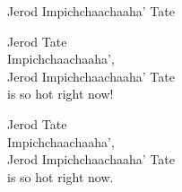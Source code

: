 \begin{song}{Jerod Impichchaachaaha’ Tate}


    Jerod Tate\\
    Impichchaachaaha’,\\
    Jerod Impichchaachaaha’ Tate\\
    is so hot right now!

    Jerod Tate\\
    Impichchaachaaha’,\\
    Jerod Impichchaachaaha’ Tate\\
    is so hot right now.

\end{song}